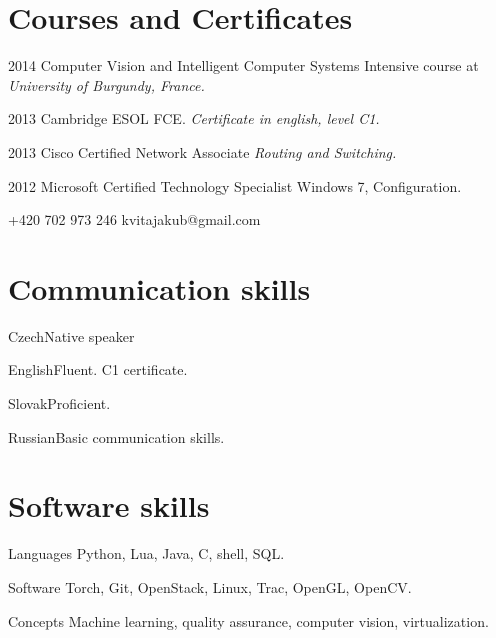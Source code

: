 \documentclass{tccv}
\begin{document}
\section{Courses and Certificates}

\begin{yearlist}
	
	\item{2014}
	{Computer Vision and Intelligent Computer Systems}
	{Intensive course at \emph{University of Burgundy, France.}}
	
	\item{2013}
	{Cambridge ESOL FCE.}
	{\emph{Certificate in english, level C1.}}
	
	\item{2013}
	{Cisco Certified Network Associate}
	{\emph{Routing and Switching.}}
	
	\item{2012}
	{Microsoft Certified Technology Specialist}
	{Windows 7, Configuration.}
	
\end{yearlist}

{+420 702 973 246}
{kvitajakub@gmail.com}

\section{Communication skills}

\begin{factlist}
\item{Czech}{Native speaker}
\item{English}{Fluent. C1 certificate.}
\item{Slovak}{Proficient.}
\item{Russian}{Basic communication skills.}
\end{factlist}

\section{Software skills}

\begin{factlist}

\item{Languages}
     {Python, Lua, Java, C, shell, SQL.}

\item{Software}
     {Torch, Git, OpenStack, Linux, Trac, OpenGL, OpenCV.}

\item{Concepts}
     {Machine learning, quality assurance, computer vision, virtualization.}

\end{factlist}
\end{document}
